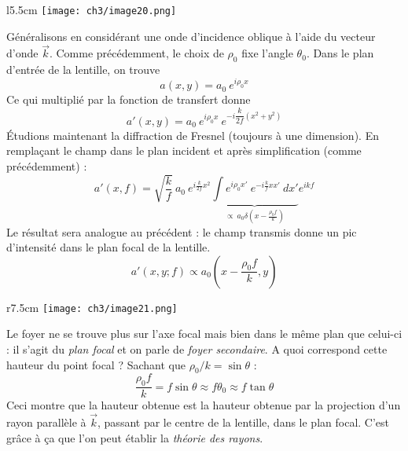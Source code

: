 	\begin{wrapfigure}[8]{l}{5.5cm}
	\vspace{-5mm}
	\texttt{[image: ch3/image20.png]}
	\end{wrapfigure}
Généralisons en considérant une onde d'incidence oblique à l'aide du vecteur d'onde $\vec{k}$. Comme 
précédemment, le choix de $\rho_0$ fixe l'angle $\theta_0$. Dans le plan d'entrée de la lentille, on 
trouve
\begin{equation}
a(x,y) = a_0\ e^{i\rho_0x}
\end{equation} 
Ce qui multiplié par la fonction de transfert donne
\begin{equation}
a'(x,y) = a_0\ e^{i\rho_0x}\ e^{-i\dfrac{k}{2f}(x^2+y^2)}
\end{equation}
Étudions maintenant la diffraction de Fresnel (toujours à une dimension). En remplaçant le champ dans 
le plan incident et après simplification (comme précédemment) :
\begin{equation}
a'(x,f) = \sqrt{\frac{k}{f}}\ a_0\ e^{i\frac{k}{2f}x^2} \underbrace{\int e^{i\rho_0x'}\ e^{-i\frac{k}{f}xx'}\ dx'}_{
\propto\ a_0\delta(x-\frac{\rho_0f}{k} )} 
e^{ikf}
\end{equation}
Le résultat sera analogue au précédent : le champ transmis donne un pic d'intensité dans le plan focal de 
la lentille.
\begin{equation}
a'(x,y;f) \propto a_0\left(x-\dfrac{\rho_0f}{k},y\right)
\end{equation}

	\begin{wrapfigure}[8]{r}{7.5cm}
	\vspace{-5mm}
	\texttt{[image: ch3/image21.png]}
	\end{wrapfigure}
Le foyer ne se trouve plus sur l'axe focal mais bien dans le même plan que celui-ci : il s'agit du 
\textit{plan focal} et on parle de \textit{foyer secondaire}. A quoi correspond cette hauteur du 
point focal ? Sachant que $\rho_0/k = \sin\theta$ :
\begin{equation}
\dfrac{\rho_0f}{k} = f\sin\theta \approx f\theta_0 \approx f\tan\theta
\end{equation}
Ceci montre que la hauteur obtenue est la hauteur obtenue par la projection d'un rayon parallèle à $\vec{k}$, 
passant par le centre de la lentille, dans le plan focal. C'est grâce à ça que l'on peut établir la 
\textit{théorie des rayons}.\\

